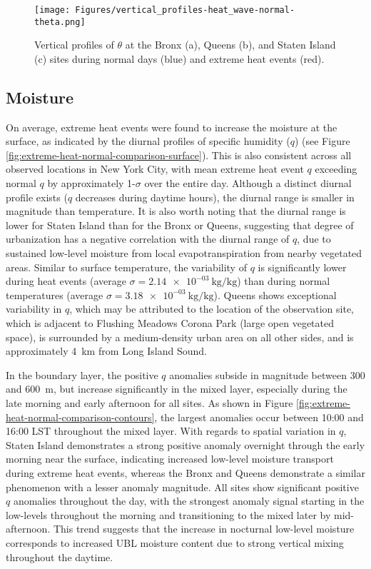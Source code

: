 \begin{figure}[ht]
	\centering
	\texttt{[image: Figures/vertical\_profiles-heat\_wave-normal-theta.png]}
	\caption{Vertical profiles of $\theta$ at the Bronx (a), Queens (b), and Staten Island (c) sites during normal days (blue) and extreme heat events (red).}
	\label{fig:vertical_profiles-heat_wave-normal-theta}
\end{figure}

\FloatBarrier

\subsection{Moisture}
On average, extreme heat events were found to increase the moisture at the surface, as indicated by the diurnal profiles of specific humidity ($q$) (see Figure \ref{fig:extreme-heat-normal-comparison-surface}). This is also consistent across all observed locations in New York City, with mean extreme heat event $q$ exceeding normal $q$ by approximately 1-$\sigma$ over the entire day. Although a distinct diurnal profile exists ($q$ decreases during daytime hours), the diurnal range is smaller in magnitude than temperature. It is also worth noting that the diurnal range is lower for Staten Island than for the Bronx or Queens, suggesting that degree of urbanization has a negative correlation with the diurnal range of $q$, due to sustained low-level moisture from local evapotranspiration from nearby vegetated areas. Similar to surface temperature, the variability of $q$ is significantly lower during heat events (average $ \sigma = \SI{2.14e-03}{\kilo\gram\per\kilo\gram} $) than during normal temperatures (average $ \sigma = \SI{3.18e-03}{\kilo\gram\per\kilo\gram} $). Queens shows exceptional variability in $q$, which may be attributed to the location of the observation site, which is adjacent to Flushing Meadows Corona Park (large open vegetated space), is surrounded by a medium-density urban area on all other sides, and is approximately \SI{4}{\kilo\meter} from Long Island Sound. 

In the boundary layer, the positive $q$ anomalies subside in magnitude between 300 and \SI{600}{\meter}, but increase significantly in the mixed layer, especially during the late morning and early afternoon for all sites. As shown in Figure \ref{fig:extreme-heat-normal-comparison-contours}, the largest anomalies occur between 10:00 and 16:00 LST throughout the mixed layer. With regards to spatial variation in $q$, Staten Island demonstrates a strong positive anomaly overnight through the early morning near the surface, indicating increased low-level moisture transport during extreme heat events, whereas the Bronx and Queens demonstrate a similar phenomenon with a lesser anomaly magnitude. All sites show significant positive $q$ anomalies throughout the day, with the strongest anomaly signal starting in the low-levels throughout the morning and transitioning to the mixed later by mid-afternoon. This trend suggests that the increase in nocturnal low-level moisture corresponds to increased UBL moisture content due to strong vertical mixing throughout the daytime.

